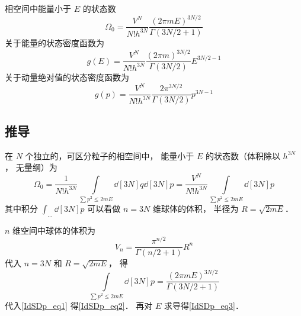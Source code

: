 
\begin{issues}
\issueDraft
\end{issues}


相空间中能量小于 $E$ 的状态数
\begin{equation}\label{IdSDp_eq2}
\Omega_0 = \frac{V^N}{N! h^{3N}} \frac{(2\pi mE)^{3N/2}}{\Gamma(3N/2+1)}
\end{equation}
关于能量的状态密度函数为
\begin{equation}\label{IdSDp_eq3}
g(E) = \frac{V^N}{N! h^{3N}} \frac{(2\pi m)^{3N/2}}{\Gamma(3N/2)} E^{3N/2 - 1}
\end{equation}
关于动量绝对值的状态密度函数为
\begin{equation}
g(p) = \frac{V^N}{N! h^{3N}} \frac{2\pi^{3N/2}}{\Gamma(3N/2)} p^{3N - 1}
\end{equation}


\subsection{推导}
在 $N$ 个独立的，可区分粒子的相空间中， 能量小于 $E$ 的状态数（体积除以 $h^{3N}$， 无量纲）为
\begin{equation}\label{IdSDp_eq1}
\Omega_0 = \frac{1}{N! h^{3N}} \int\limits_{\sum p^2 \leqslant 2mE} \dd[3N]{q} \dd[3N]{p} = \frac{V^N}{N! h^{3N}} \int\limits_{\sum p^2 \leqslant 2mE} \dd[3N]{p}
\end{equation}
其中积分 $\int_{\dots} \dd[3N]{p} $ 可以看做 $n=3N$ 维球体的体积， 半径为 $R = \sqrt{2mE}$． 

$n$ 维空间中球体的体积为
\begin{equation}
V_n = \frac{\pi^{n/2}}{\Gamma(n/2+1)}R^n
\end{equation}
代入 $n=3N$ 和 $R = \sqrt{2mE} $， 得
\begin{equation}
\int\limits_{\sum p^2 \leqslant 2mE} \dd[3N]{p} = \frac{(2\pi mE)^{3N/2}}{\Gamma(3N/2+1)}
\end{equation}
代入\autoref{IdSDp_eq1} 得\autoref{IdSDp_eq2}． 再对 $E$ 求导得\autoref{IdSDp_eq3}．
